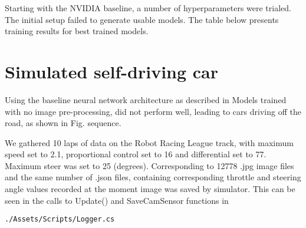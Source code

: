 
Starting with the NVIDIA baseline, a number of hyperparameters were trialed. The initial setup failed to generate usable models. 
The table below presents training results for best trained models.

\section{Simulated self-driving car}

Using the baseline neural network architecture as described in 
Models trained with no image pre-processing, did not perform well, leading to cars driving off the road, as shown in Fig.  sequence.

We gathered 10 laps of data on the Robot Racing League track, with maximum speed set to 2.1, proportional control set to 16 and differential set to 77. Maximum steer was set to 25 (degrees). Corresponding to 12778 .jpg image files and the same number of  .json files, containing corresponding throttle and steering angle values recorded at the moment image was saved by simulator. This can be seen in the calls to Update() and SaveCamSensor functions in  
\begin{verbatim}
./Assets/Scripts/Logger.cs
\end{verbatim}

